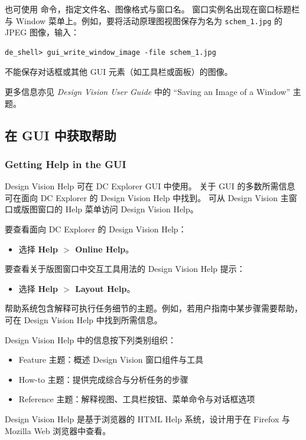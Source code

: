 也可使用  命令，指定文件名、图像格式与窗口名。
窗口实例名出现在窗口标题栏与 Window 菜单上。例如，要将活动原理图视图保存为名为 \texttt{schem\_1.jpg} 的 JPEG 图像，输入：
\begin{lstlisting}
de_shell> gui_write_window_image -file schem_1.jpg
\end{lstlisting}

不能保存对话框或其他 GUI 元素（如工具栏或面板）的图像。

更多信息亦见 \textit{Design Vision User Guide} 中的 ``Saving an Image of a Window'' 主题。

\subsection{在 GUI 中获取帮助}
\subsubsection*{Getting Help in the GUI}

Design Vision Help 可在 DC Explorer GUI 中使用。
关于 GUI 的多数所需信息可在面向 DC Explorer 的 Design Vision Help 中找到。
可从 Design Vision 主窗口或版图窗口的 Help 菜单访问 Design Vision Help。

要查看面向 DC Explorer 的 Design Vision Help：
\begin{itemize}
  \item 选择 \textbf{Help $>$ Online Help}。
\end{itemize}

要查看关于版图窗口中交互工具用法的 Design Vision Help 提示：
\begin{itemize}
  \item 选择 \textbf{Help $>$ Layout Help}。
\end{itemize}

帮助系统包含解释可执行任务细节的主题。例如，若用户指南中某步骤需要帮助，可在 Design Vision Help 中找到所需信息。

Design Vision Help 中的信息按下列类别组织：
\begin{itemize}
  \item Feature 主题：概述 Design Vision 窗口组件与工具
  \item How-to 主题：提供完成综合与分析任务的步骤
  \item Reference 主题：解释视图、工具栏按钮、菜单命令与对话框选项
\end{itemize}

Design Vision Help 是基于浏览器的 HTML Help 系统，设计用于在 Firefox 与 Mozilla Web 浏览器中查看。

